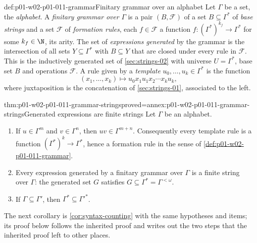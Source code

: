 \begin{hbdefinition}{def:p01-w02-p01-011-grammar}{Finitary grammar over an alphabet}
Let \(\Gamma\) be a set, the \emph{alphabet}. A \emph{finitary grammar over
\(\Gamma\)} is a pair \((B,\mathcal F)\) of a set \(B\subseteq\Gamma^*\) of
\emph{base strings} and a set \(\mathcal F\) of \emph{formation rules},
each \(f\in\mathcal F\) a function \(f:(\Gamma^*)^{k_f}\to\Gamma^*\) for some
\(k_f\in\N\), its arity. The set of \emph{expressions generated} by the
grammar is the intersection of all sets \(Y\subseteq\Gamma^*\) with
\(B\subseteq Y\) that are closed under every rule in \(\mathcal F\). This is
the inductively generated set of \cref{sec:strings-02} with universe
\(U=\Gamma^*\), base set \(B\) and operations \(\mathcal F\). A rule given by
a \emph{template} \(u_0,\ldots,u_k\in\Gamma^*\) is the function
\[
  (x_1,\ldots,x_k)\mapsto u_0x_1u_1x_2\cdots x_ku_k ,
\]
where juxtaposition is the concatenation of \cref{sec:strings-01},
associated to the left.
\end{hbdefinition}

\begin{hblemma}{thm:p01-w02-p01-011-grammar-strings}{proved=annex:p01-w02-p01-011-grammar-strings}{Generated expressions are finite strings}
Let \(\Gamma\) be an alphabet.
\begin{enumerate}
  \item If \(u\in\Gamma^m\) and \(v\in\Gamma^n\), then
        \(uv\in\Gamma^{m+n}\). Consequently every template rule is a
        function \((\Gamma^*)^k\to\Gamma^*\), hence a formation rule in the
        sense of \cref{def:p01-w02-p01-011-grammar}.
  \item Every expression generated by a finitary grammar over \(\Gamma\)
        is a finite string over \(\Gamma\): the generated set \(G\)
        satisfies \(G\subseteq\Gamma^*=\Gamma^{<\omega}\).
  \item If \(\Gamma\subseteq\Gamma'\), then
        \(\Gamma^*\subseteq\Gamma'^*\).
\end{enumerate}
\end{hblemma}

The next corollary is \cref{cor:syntax-counting} with the same hypotheses
and items; its proof below follows the inherited proof and writes out the
two steps that the inherited proof left to other places.

